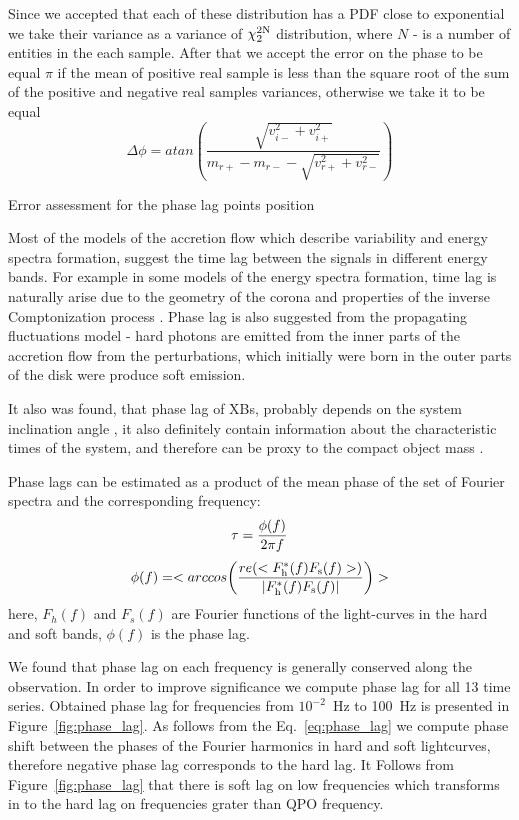 \documentclass[a4paper,fleqn,usenatbib]{mnras}
\begin{document}
\begin{table}
Since we accepted that each of these distribution has a PDF close to exponential we take their variance as a variance of $\chi_2^{\rm 2N}$ distribution, where $N$ - is a number of entities in the each sample. 
After that we accept the error on the phase to be equal $\pi$ if the mean of positive real sample is less than the square root of the sum of the positive and negative real samples variances, otherwise we take it to be equal
\begin{equation}
        \Delta \phi = atan{\left(\frac{\sqrt{v_{i-}^2 + v_{i+}^{2}}}{m_{r+} - m_{r-} - \sqrt{v_{r+}^2 + v_{r-}^2}}\right)}
\end{equation}



    Error assessment for the phase lag points position 


    Most of the models of the accretion flow which describe variability and energy spectra formation, suggest the time lag between the signals in different energy bands. 
For example in some models of the energy spectra formation, time lag is naturally arise due to the geometry of the corona and properties of the inverse Comptonization process \citep[see, e.g.][]{kotov01}.
Phase lag is also suggested from the propagating fluctuations model - hard photons are emitted from the inner parts of the accretion flow from the perturbations, which initially were born in the outer parts of the disk were produce soft emission.  

It also was found, that phase lag of XBs, probably depends on the system inclination angle \citep{eijeden17}, it also definitely contain information about the characteristic times of the system, and therefore can be proxy to the compact object mass \citep{}. 

Phase lags can be estimated as a product of the mean phase of the set of Fourier spectra and the corresponding frequency:
\begin{equation}
                \tau = \frac{\phi(f)}{2\pi f}\\
\end{equation}
\begin{equation}
        \phi(f) = <arccos{\left(\frac{re(<F_{\rm h}^{*}(f)F_{\rm s}(f)>)}{|F_{\rm h}^{*}(f) F_{\rm s}(f)|}\right)}>
        \label{eq:phase_lag}
\end{equation}
here, $F_h(f)$ and $F_s(f)$ are Fourier functions of the light-curves in the hard and soft bands, $\phi(f)$ is the phase lag. 

We found that phase lag on each frequency is generally conserved along the observation.
In order to improve significance we compute phase lag for all 13 time series.
Obtained phase lag for frequencies from $10^{-2}$~Hz to 100~Hz is presented in Figure~\ref{fig:phase_lag}.
As follows from the Eq.~\ref{eq:phase_lag} we compute phase shift between the phases of the Fourier harmonics in hard and soft lightcurves, therefore negative phase lag corresponds to the hard lag.
It Follows from Figure~\ref{fig:phase_lag} that there is soft lag on low frequencies which transforms in to the hard lag on frequencies grater than QPO frequency. 


\end{table}
\end{document}
